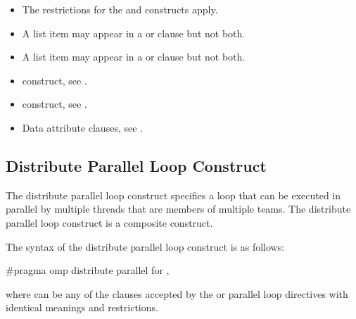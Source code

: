\restrictions
\begin{itemize}
\item The restrictions for the  and  constructs apply.
\item A list item may appear in a  or  clause but not both.
\item A list item may appear in a  or  clause but not both.

\end{itemize}

\crossreferences
\begin{itemize}
\item {} construct, see 
.

\item {} construct, see 
.

\item Data attribute clauses, see 
.
\end{itemize}









\subsection{Distribute Parallel Loop Construct}
\label{subsec:Distribute Parallel Loop Construct}
\summary
The distribute parallel loop construct specifies a loop that can be executed in parallel by 
multiple threads that are members of multiple teams. The distribute parallel loop construct is a composite construct.

\syntax
The syntax of the distribute parallel loop construct is as follows:

\ccppspecificstart
\begin{boxedcode}
\#pragma omp distribute parallel for \plc{[clause[ [},\plc{] clause] ... ]}
\end{boxedcode}

where  can be any of the clauses accepted by the  or parallel loop 
directives with identical meanings and restrictions.
\ccppspecificend

